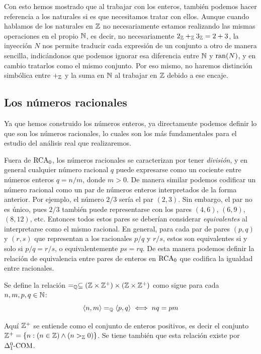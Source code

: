 Con esto hemos mostrado que al trabajar con los enteros, también podemos hacer referencia a los naturales si es que necesitamos tratar con ellos. Aunque cuando hablamos de los naturales en $\ZZ$ no necesariamente estamos realizando las mismas operaciones en el propio $\NN$, es decir, no necesariamente $2_{\ZZ} +_{\ZZ} 3_{\ZZ} = 2 + 3$, la inyección $N$ nos permite traducir cada expresión de un conjunto a otro de manera sencilla, indicándonos que podemos ignorar esa diferencia entre $\NN$ y $\RANGO{N}$, y en cambio tratarlos como el mismo conjunto. Por eso mismo, no haremos distinción simbólica entre $+_{\ZZ}$ y la suma en $\NN$ al trabajar en $\ZZ$ debido a ese encaje.

\subsection{Los números racionales}

Ya que hemos construido los números enteros, ya directamente podemos definir lo que son los números racionales, lo cuales son los más fundamentales para el estudio del análisis real que realizaremos.

Fuera de $\RCA$, los números racionales se caracterizan por tener \emph{división}, y en general cualquier número racional $q$ puede expresarse como un cociente entre números enteros $q = n / m$, donde $m > 0$. De manera similar podemos codificar un número racional como un par de números enteros interpretados de la forma anterior. Por ejemplo, el número $2/3$ sería el par $(2, 3)$. Sin embargo, el par no es único, pues $2/3$ también puede representarse con los pares $(4, 6)$, $(6, 9)$, $(8, 12)$, etc. Entonces todos estos pares se deberían considerar \emph{equivalentes} al interpretarse como el mismo racional. En general, para cada par de pares $(p, q)$ y $(r, s)$ que representan a los racionales $p/q$ y $r/s$, estos son equivalentes si y solo si $p/q = r/s$, o equivalentemente $ps = rq$. De esta manera podemos definir la relación de equivalencia entre pares de enteros en $\RCA$ que codifica la igualdad entre racionales.

\begin{definition}[Igualdad en $\QQ$]
	Se define la relación $=_{\QQ}\subseteq\pa*{\ZZ\times\ZZ^{+}}\times\pa*{\ZZ\times\ZZ^{+}}$ como sigue para cada $n, m, p, q\in\NN$:
	\[
		\inner*{n, m} =_{\QQ}\inner*{p, q}\iff nq = pm
	\]
\end{definition}

Aquí $\ZZ^{+}$ se entiende como el conjunto de enteros positivos, es decir el conjunto $\ZZ^{+} =\set*{n:\pa*{n\in\ZZ}\land\pa*{n >_{\ZZ} 0}}$. Se tiene también que esta relación existe por $\COMPRENSION{\Delta_{1}^{0}}$.

